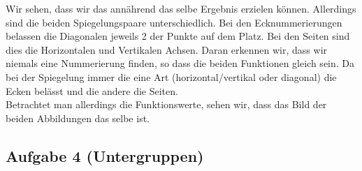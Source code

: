 \documentclass[11pt,a4paper,ngerman]{article}
\begin{document}
\begin{enumerate}[\bfseries a)]
Wir sehen, dass wir das annährend das selbe Ergebnis erzielen können. Allerdings sind die beiden Spiegelungspaare unterschiedlich. Bei den Ecknummerierungen belassen die Diagonalen jeweils 2 der Punkte auf dem Platz. Bei den Seiten sind dies die Horizontalen und Vertikalen Achsen. Daran erkennen wir, dass wir niemals eine Nummerierung finden, so dass die beiden Funktionen gleich sein. Da bei der Spiegelung immer die eine Art (horizontal/vertikal oder diagonal) die Ecken belässt und die andere die Seiten.\\

Betrachtet man allerdings die Funktionswerte, sehen wir, dass das Bild der beiden Abbildungen das selbe ist.
\end{enumerate}

\subsection*{Aufgabe 4 \mdseries (Untergruppen)}
\end{document}
